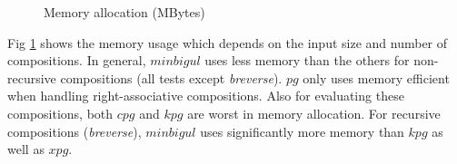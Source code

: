 \documentclass[runningheads]{llncs}
\begin{document}
\begin{figure}
{
    }
    \caption{Memory allocation (MBytes)}
    \label{fig:memory-allocation}
\end{figure}

Fig \ref{fig:memory-allocation} shows the memory usage which depends on the input size and number of compositions. In general, $minbigul$ uses less memory than the others for non-recursive compositions (all tests except \textit{breverse}). $pg$ only uses memory efficient when handling right-associative compositions. Also for evaluating these  compositions, both $cpg$ and $kpg$ are worst in memory allocation. For recursive compositions (\textit{breverse}), $minbigul$ uses significantly more memory than $kpg$ as well as $xpg$.
\end{document}
